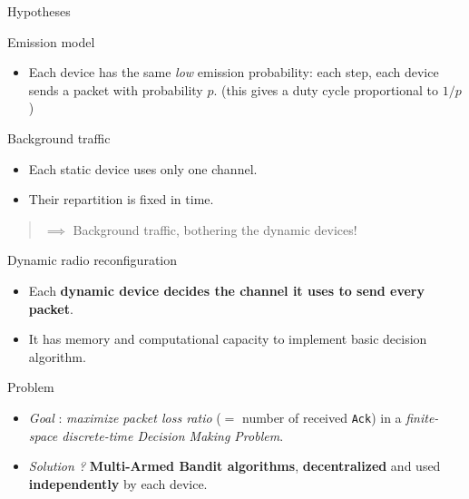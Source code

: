 \documentclass[12pt,english,ignorenonframetext,aspectratio=169,]{beamer}
\providecommand{\tightlist}{%
  \setlength{\itemsep}{0pt}\setlength{\parskip}{0pt}}
\begin{document}
\begin{frame}{Hypotheses}

\begin{block}{Emission model}

\begin{itemize}
\tightlist
\item
  Each device has the same \emph{low} emission probability: \newline
   each step, each device sends a packet with probability \(p\).
  \newline
   \hfill{}\small{(this gives a duty cycle proportional to $1/p$)}
\end{itemize}

\end{block}

\begin{block}{Background traffic}

\begin{itemize}
\tightlist
\item
  Each static device uses only one channel.
\item
  Their repartition is fixed in time.
\end{itemize}

\end{block}

\begin{quote}
\(\implies\) Background traffic, bothering the dynamic devices!
\end{quote}

\begin{block}{Dynamic radio reconfiguration}

\begin{itemize}
\tightlist
\item
  Each \textbf{dynamic device decides the channel it uses to send every
  packet}.
\item
  It has memory and computational capacity to implement basic decision
  algorithm.
\end{itemize}

\end{block}

\begin{block}{Problem}

\begin{itemize}
\tightlist
\item
  \emph{Goal} : \emph{maximize packet loss ratio} (\(=\) number of
  received \texttt{Ack}) in a \emph{finite-space discrete-time Decision
  Making Problem}.
\item
  \emph{Solution ?} \textbf{Multi-Armed Bandit algorithms},
  \textbf{decentralized} and used \textbf{independently} by each device.
\end{itemize}

\end{block}

\end{frame}
\end{document}
